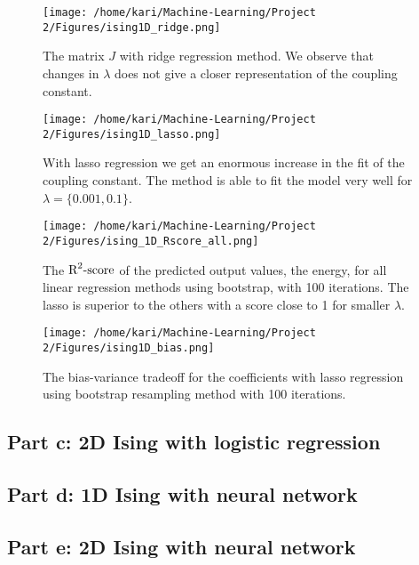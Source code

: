 \documentclass[a4paper,12pt, english]{article}
\begin{document}
\begin{figure} \label{fig:ridge}
\centering
\texttt{[image: /home/kari/Machine-Learning/Project 2/Figures/ising1D\_ridge.png]}
\caption{The matrix $J$ with ridge regression method. We observe that changes in $\lambda$ does not give a closer representation of the coupling constant.}
\label{fig:ridge}
\end{figure}

\begin{figure} \label{fig:lasso}
\centering
\texttt{[image: /home/kari/Machine-Learning/Project 2/Figures/ising1D\_lasso.png]}
\caption{With lasso regression we get an enormous increase in the fit of the coupling constant. The method is able to fit the model very well for $\lambda = \{0.001, 0.1\}$.}
\label{fig:lasso}
\end{figure}

\begin{figure} \label{fig:1D_R_all}
\centering
\texttt{[image: /home/kari/Machine-Learning/Project 2/Figures/ising\_1D\_Rscore\_all.png]}
\caption{The $\textnormal{R}^2\textnormal{-score}$ of the predicted output values, the energy, for all linear regression methods using bootstrap, with 100 iterations. The lasso is superior to the others with a score close to 1 for smaller $\lambda$.}
\label{fig:lasso}
\end{figure}

\begin{figure} \label{fig:1D_bias}
\centering
\texttt{[image: /home/kari/Machine-Learning/Project 2/Figures/ising1D\_bias.png]}
\caption{The bias-variance tradeoff for the coefficients with lasso regression using bootstrap resampling method with 100 iterations.}
\label{fig:lasso}
\end{figure}


\subsection{Part c: 2D Ising with logistic regression}

\subsection{Part d: 1D Ising with neural network}

\subsection{Part e: 2D Ising with neural network}
\end{document}
